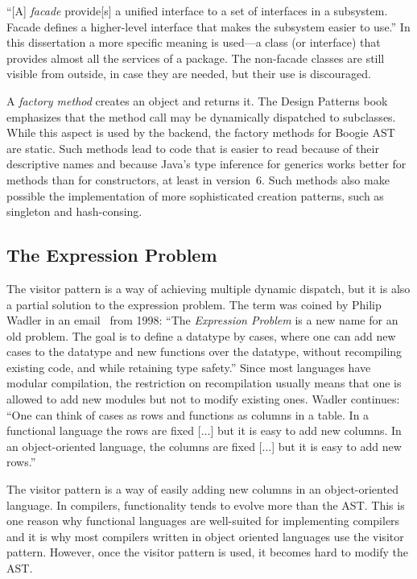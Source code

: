 \documentclass{llncs}
\begin{document}
``[A] \emph{facade} provide[s] a unified interface to a set
of interfaces in a subsystem. Facade defines a higher-level
interface that makes the subsystem easier to use.'' In this
dissertation a more specific meaning is used---a class (or
interface) that provides almost all the services of a package.
The non-facade classes are still visible from outside, in case
they are needed, but their use is discouraged.

A \emph{factory method} creates an object and returns it. The
Design Patterns book emphasizes that the method call may be
dynamically dispatched to subclasses. While this aspect is used
by the backend, the factory methods for Boogie AST are static.
Such methods lead to code that is easier to read because of their
descriptive names and because Java's type inference for generics
works better for methods than for constructors, at least in
version~6. Such methods also make possible the implementation
of more sophisticated creation patterns, such as singleton and
hash-consing.

\subsection{The Expression Problem}

The visitor pattern is a way of achieving multiple dynamic
dispatch, but it is also a partial solution to the
expression problem. The term was coined by Philip Wadler in an
email~\cite{wadler1998ep} from 1998: ``The \emph{Expression
Problem} is a new name for an old problem. The goal is to define
a datatype by cases, where one can add new cases to the datatype
and new functions over the datatype, without recompiling existing
code, and while retaining type safety.'' Since most languages
have modular compilation, the restriction on recompilation
usually means that one is allowed to add new modules but not to
modify existing ones. Wadler continues: ``One can think of cases
as rows and functions as columns in a table. In a functional
language the rows are fixed [$\ldots$] but it is easy to add new
columns. In an object-oriented language, the columns are fixed
[$\ldots$] but it is easy to add new rows.''

The visitor pattern is a way of easily adding new columns in
an object-oriented language. In compilers, functionality tends
to evolve more than the AST. This is one reason why functional
languages are well-suited for implementing compilers and it is
why most compilers written in object oriented languages use the
visitor pattern. However, once the visitor pattern is used, it
becomes hard to modify the AST.
\end{document}
